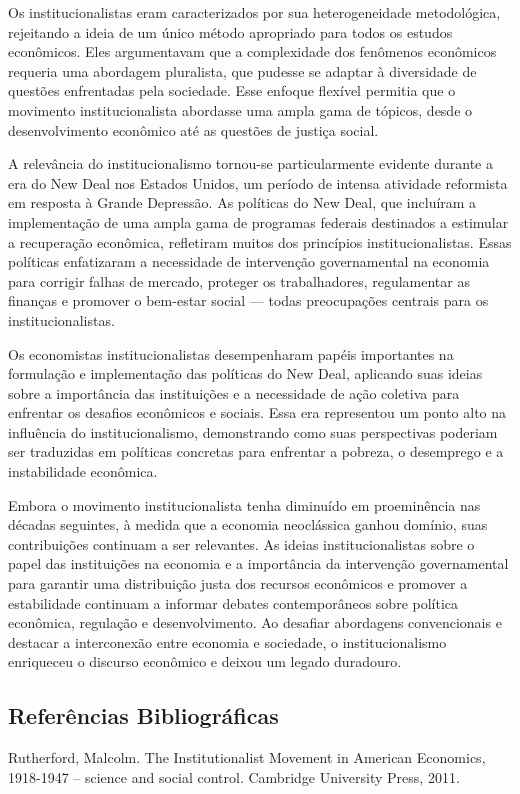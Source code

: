 \documentclass[a4paper,12pt]{article}[abntex2]
\begin{document}
Os institucionalistas eram caracterizados por sua heterogeneidade metodológica, rejeitando a ideia de um único método apropriado para todos os estudos econômicos. Eles argumentavam que a complexidade dos fenômenos econômicos requeria uma abordagem pluralista, que pudesse se adaptar à diversidade de questões enfrentadas pela sociedade. Esse enfoque flexível permitia que o movimento institucionalista abordasse uma ampla gama de tópicos, desde o desenvolvimento econômico até as questões de justiça social.

A relevância do institucionalismo tornou-se particularmente evidente durante a era do New Deal nos Estados Unidos, um período de intensa atividade reformista em resposta à Grande Depressão. As políticas do New Deal, que incluíram a implementação de uma ampla gama de programas federais destinados a estimular a recuperação econômica, refletiram muitos dos princípios institucionalistas. Essas políticas enfatizaram a necessidade de intervenção governamental na economia para corrigir falhas de mercado, proteger os trabalhadores, regulamentar as finanças e promover o bem-estar social — todas preocupações centrais para os institucionalistas.

Os economistas institucionalistas desempenharam papéis importantes na formulação e implementação das políticas do New Deal, aplicando suas ideias sobre a importância das instituições e a necessidade de ação coletiva para enfrentar os desafios econômicos e sociais. Essa era representou um ponto alto na influência do institucionalismo, demonstrando como suas perspectivas poderiam ser traduzidas em políticas concretas para enfrentar a pobreza, o desemprego e a instabilidade econômica.

Embora o movimento institucionalista tenha diminuído em proeminência nas décadas seguintes, à medida que a economia neoclássica ganhou domínio, suas contribuições continuam a ser relevantes. As ideias institucionalistas sobre o papel das instituições na economia e a importância da intervenção governamental para garantir uma distribuição justa dos recursos econômicos e promover a estabilidade continuam a informar debates contemporâneos sobre política econômica, regulação e desenvolvimento. Ao desafiar abordagens convencionais e destacar a interconexão entre economia e sociedade, o institucionalismo enriqueceu o discurso econômico e deixou um legado duradouro.

\subsection{\textbf{Referências Bibliográficas}}
Rutherford, Malcolm. The Institutionalist Movement in American Economics, 1918-1947 –
science and social control. Cambridge University Press, 2011.
\end{document}
